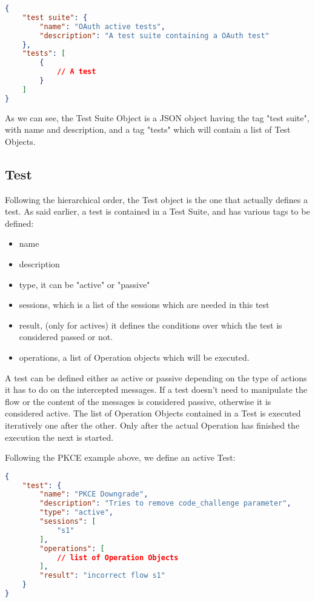 \begin{lstlisting}[language=json, caption=Test Suite definition]
{
    "test suite": {
        "name": "OAuth active tests",
        "description": "A test suite containing a OAuth test"
    },
    "tests": [
        {
            // A test
        }
    ]
}
\end{lstlisting}

As we can see, the Test Suite Object is a JSON object having the tag "test suite", with name and description, and a tag "tests" which will contain a list of Test Objects.

\subsection{Test}
Following the hierarchical order, the Test object is the one that actually defines a test. As said earlier, a test is contained in a Test Suite, and has various tags to be defined:
\begin{itemize}
    \item name
    \item description
    \item type, it can be "active" or "passive"
    \item sessions, which is a list of the sessions which are needed in this test
    \item result, (only for actives) it defines the conditions over which the test is considered passed or not.
    \item operations, a list of Operation objects which will be executed.
\end{itemize}

A test can be defined either as active or passive depending on the type of actions it has to do on the intercepted messages. If a test doesn't need to manipulate the flow or the content of the messages is considered passive, otherwise it is considered active.
The list of Operation Objects contained in a Test is executed iteratively one after the other. Only after the actual Operation has finished the execution the next is started.

Following the PKCE example above, we define an active Test:

\begin{lstlisting}[language=json, caption=Active test definition]
{
    "test": {
        "name": "PKCE Downgrade",
        "description": "Tries to remove code_challenge parameter",
        "type": "active",
        "sessions": [
            "s1"
        ],
        "operations": [
            // list of Operation Objects
        ],
        "result": "incorrect flow s1"
    }
}    
\end{lstlisting}

